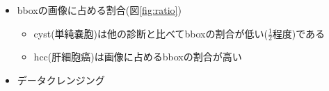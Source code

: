 \documentclass[a4j]{ujarticle}
\newcommand{\Fref}[1]{\mbox{図\ref{fig:#1}}}
\begin{document}
\begin{itemize}
\begin{itemize}
\begin{itemize}
\begin{itemize}
                    \end{itemize}
				\end{itemize}
				\item bboxの画像に占める割合(\Fref{ratio})
                \begin{itemize}
                    \item cyst(単純嚢胞)は他の診断と比べてbboxの割合が低い($\frac{1}{2}$程度)である
                    \item hcc(肝細胞癌)は画像に占めるbboxの割合が高い
                \end{itemize}
			\end{itemize}
        \end{itemize}
        \begin{itemize}
            \item データクレンジング
            \begin{figure}[ht]
				\centering

\end{figure}
\end{itemize}
\end{document}

